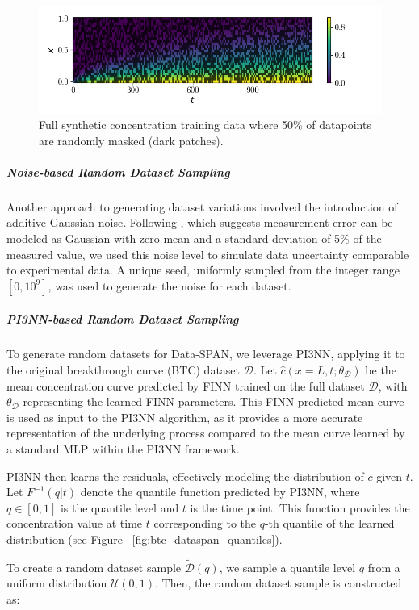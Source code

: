 \begin{figure}[h]
    \centering
    \includegraphics{figs/c_diss_field_train_random_subset.png}
    \caption{Full synthetic concentration training data where 50\% of datapoints are randomly masked (dark patches).}
    \label{fig:training_data_mask}
\end{figure}


\subparagraph{Noise-based Random Dataset Sampling}

Another approach to generating dataset variations involved the introduction of additive Gaussian noise. Following \cite{nowak2016entropy}, which suggests measurement error can be modeled as Gaussian with zero mean and a standard deviation of 5\% of the measured value, we used this noise level to simulate data uncertainty comparable to experimental data.
A unique seed, uniformly sampled from the integer range $[0, 10^9]$, was used to generate the noise for each dataset. %


\subparagraph{PI3NN-based Random Dataset Sampling}
\label{sec:random_dataset_sampling}
To generate random datasets for Data-SPAN, we leverage PI3NN, applying it to the original breakthrough curve (BTC) dataset $\mathcal{D}$. Let $\hat{c}(x=L, t; \theta_{\mathcal{D}})$ be the mean concentration curve predicted by FINN trained on the full dataset $\mathcal{D}$, with $\theta_{\mathcal{D}}$ representing the learned FINN parameters. This FINN-predicted mean curve is used as input to the PI3NN algorithm, as it provides a more accurate representation of the underlying process compared to the mean curve learned by a standard MLP within the PI3NN framework.

PI3NN then learns the residuals, effectively modeling the distribution of $c$ given $t$. Let $F^{-1}(q | t)$ denote the quantile function predicted by PI3NN, where $q \in [0, 1]$ is the quantile level and $t$ is the time point. This function provides the concentration value at time $t$ corresponding to the $q$-th quantile of the learned distribution (see Figure ~\vref{fig:btc_dataspan_quantiles}).

To create a random dataset sample $\tilde{\mathcal{D}}(q)$, we sample a quantile level $q$ from a uniform distribution $\mathcal{U}(0, 1)$. Then, the random dataset sample is constructed as:

